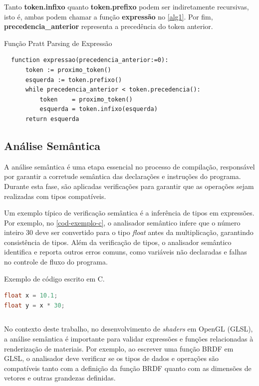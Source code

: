 \documentclass[english, 
               brazil, 
               bsc] %
               {dcomp-abntex2}
\begin{document}
Tanto \textbf{token.infixo} quanto \textbf{token.prefixo} podem ser indiretamente recursivas, isto é, ambas podem chamar a função \textbf{expressão} no \autoref{alg1}. 
Por fim, \textbf{precedencia\_anterior} representa a precedência do token anterior.


\begin{algoritmo}[H]
        \caption{Função Pratt Parsing de Expressão}
        \label{alg1}
  \begin{lstlisting}
  function expressao(precedencia_anterior:=0):
      token := proximo_token()
      esquerda := token.prefixo()
      while precedencia_anterior < token.precedencia():
          token    = proximo_token()
          esquerda = token.infixo(esquerda)
      return esquerda
  \end{lstlisting}
\end{algoritmo}


\subsection{Análise Semântica}


A análise semântica é uma etapa essencial no processo de compilação, responsável por garantir a corretude semântica das declarações e instruções do programa. Durante esta fase, são aplicadas verificações para garantir que as operações sejam realizadas com tipos compatíveis.


Um exemplo típico de verificação semântica é a inferência de tipos em expressões. Por exemplo, no \autoref{cod-exemplo-c}, o analisador semântico infere que o número inteiro $30$ deve ser convertido para o tipo \textit{float} antes da multiplicação, garantindo consistência de tipos. Além da verificação de tipos, o analisador semântico identifica e reporta outros erros comuns, como variáveis não declaradas e falhas no controle de fluxo do programa.


\begin{codigo}
\caption{\small Exemplo de código escrito em C.}
  \label{cod-exemplo-c}
\begin{lstlisting}[language=C]
float x = 10.1;
float y = x * 30;
\end{lstlisting}
\end{codigo}


\begin{lstlisting}
\end{lstlisting}




No contexto deste trabalho, no desenvolvimento de \textit{shaders} em OpenGL (GLSL), a análise semântica é importante para validar expressões e funções relacionadas à renderização de materiais. Por exemplo, ao escrever uma função BRDF em GLSL, o analisador deve verificar se os tipos de dados e operações são compatíveis tanto com a definição da função BRDF quanto com as dimensões de vetores e outras grandezas definidas.
\end{document}
